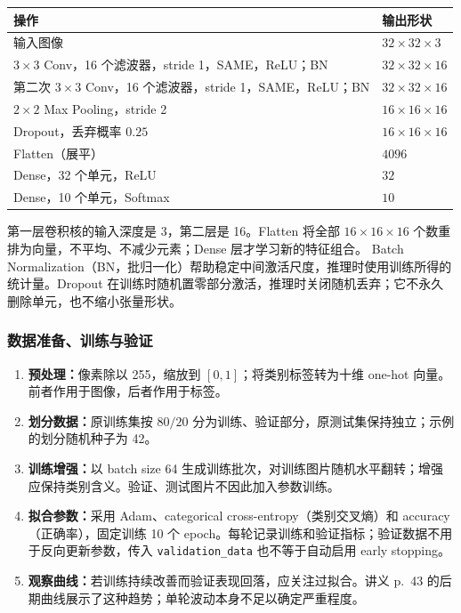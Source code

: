 \begin{center}
\begin{tabularx}{\textwidth}{@{}>{\raggedright\arraybackslash}X>{\raggedright\arraybackslash}p{3.5cm}@{}}
  \toprule
  操作 & 输出形状 \\
  \midrule
  输入图像 & $32\times32\times3$ \\
  $3\times3$ Conv，16 个滤波器，stride 1，SAME，ReLU；BN & $32\times32\times16$ \\
  第二次 $3\times3$ Conv，16 个滤波器，stride 1，SAME，ReLU；BN & $32\times32\times16$ \\
  $2\times2$ Max Pooling，stride 2 & $16\times16\times16$ \\
  Dropout，丢弃概率 $0.25$ & $16\times16\times16$ \\
  Flatten（展平） & $4096$ \\
  Dense，32 个单元，ReLU & $32$ \\
  Dense，10 个单元，Softmax & $10$ \\
  \bottomrule
\end{tabularx}
\end{center}

第一层卷积核的输入深度是 3，第二层是 16。Flatten 将全部 $16\times16\times16$ 个数重排为向量，不平均、不减少元素；Dense 层才学习新的特征组合。
Batch Normalization（BN，批归一化）帮助稳定中间激活尺度，推理时使用训练所得的统计量。Dropout 在训练时随机置零部分激活，推理时关闭随机丢弃；它不永久删除单元，也不缩小张量形状。

\subsubsection*{数据准备、训练与验证}

\begin{enumerate}
  \item \textbf{预处理：}像素除以 255，缩放到 $[0,1]$；将类别标签转为十维 one-hot 向量。前者作用于图像，后者作用于标签。
  \item \textbf{划分数据：}原训练集按 $80/20$ 分为训练、验证部分，原测试集保持独立；示例的划分随机种子为 42。
  \item \textbf{训练增强：}以 batch size 64 生成训练批次，对训练图片随机水平翻转；增强应保持类别含义。验证、测试图片不因此加入参数训练。
  \item \textbf{拟合参数：}采用 Adam、categorical cross-entropy（类别交叉熵）和 accuracy（正确率），固定训练 10 个 epoch。每轮记录训练和验证指标；验证数据不用于反向更新参数，传入 \texttt{validation\_data} 也不等于自动启用 early stopping。
  \item \textbf{观察曲线：}若训练持续改善而验证表现回落，应关注过拟合。讲义 p.~43 的后期曲线展示了这种趋势；单轮波动本身不足以确定严重程度。
\end{enumerate}

